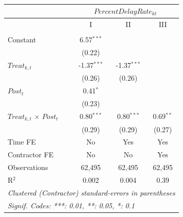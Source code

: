 \documentclass[
]{article}
\begin{document}
\begin{table}[htbp]
   \caption{}
   \centering
   \begin{tabular}{lccc}
      \toprule
      \midrule  & \multicolumn{3}{c}{$PercentDelayRate_{kt}$}\\
      \midrule  & I & II & III\\
      \midrule \\
      Constant                         & 6.57$^{***}$  &               &   \\   
                                       & (0.22)        &               &   \\   
      $Treat_{k,t}$                    & -1.37$^{***}$ & -1.37$^{***}$ &   \\   
                                       & (0.26)        & (0.26)        &   \\   
      $Post_t$                         & 0.41$^{*}$    &               &   \\   
                                       & (0.23)        &               &   \\   
      $Treat_{k,t}$ $\times$ $Post_t$  & 0.80$^{***}$  & 0.80$^{***}$  & 0.69$^{**}$\\   
                                       & (0.29)        & (0.29)        & (0.27)\\   
      \midrule 
      Time FE                          & No            & Yes           & Yes\\  
      Contractor FE                    & No            & No            & Yes\\  
      Observations                     & 62,495        & 62,495        & 62,495\\  
      R$^2$                            & 0.002         & 0.004         & 0.39\\  
      \midrule
      \multicolumn{4}{l}{\emph{Clustered (Contractor) standard-errors in parentheses}}\\
      \multicolumn{4}{l}{\emph{Signif. Codes: ***: 0.01, **: 0.05, *: 0.1}}\\
   \end{tabular}
\end{table}
\end{document}
